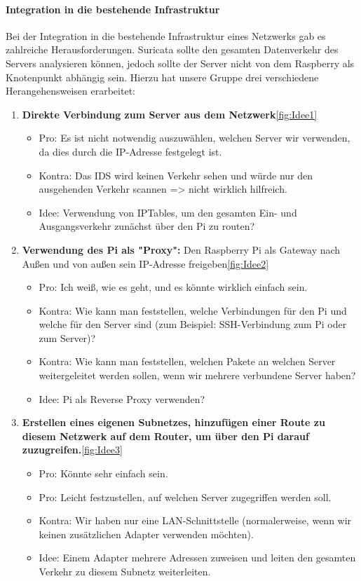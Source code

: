 \documentclass{article}
\begin{document}
\vfil \break

\paragraph{Integration in die bestehende Infrastruktur}
Bei der Integration in die bestehende Infrastruktur eines Netzwerks gab es zahlreiche Herausforderungen. Suricata sollte den gesamten Datenverkehr des Servers analysieren können, jedoch sollte der Server nicht von dem Raspberry als Knotenpunkt abhängig sein. Hierzu hat unsere Gruppe drei verschiedene Herangehensweisen erarbeitet:

\begin{enumerate}
    \item \textbf{Direkte Verbindung zum Server aus dem Netzwerk}\ref{fig:Idee1}
    \begin{itemize}
        \item Pro: Es ist nicht notwendig auszuwählen, welchen Server wir verwenden, da dies durch die IP-Adresse festgelegt ist.
        \item Kontra: Das IDS wird keinen Verkehr sehen und würde nur den ausgehenden Verkehr scannen => nicht wirklich hilfreich.
        \item Idee: Verwendung von IPTables, um den gesamten Ein- und Ausgangsverkehr zunächst über den Pi zu routen?
    \end{itemize}
    \item \textbf{Verwendung des Pi als "Proxy":} Den Raspberry Pi als Gateway nach Außen und von außen sein IP-Adresse freigeben\ref{fig:Idee2}
    \begin{itemize}
        \item Pro: Ich weiß, wie es geht, und es könnte wirklich einfach sein.
        \item Kontra: Wie kann man feststellen, welche Verbindungen für den Pi und welche für den Server sind (zum Beispiel: SSH-Verbindung zum Pi oder zum Server)?
        \item Kontra: Wie kann man feststellen, welchen Pakete an welchen Server weitergeleitet werden sollen, wenn wir mehrere verbundene Server haben?
        \item Idee: Pi als Reverse Proxy verwenden?
    \end{itemize}
    
    \item \textbf{Erstellen eines eigenen Subnetzes, hinzufügen einer Route zu diesem Netzwerk auf dem Router, um über den Pi darauf zuzugreifen.}\ref{fig:Idee3}
    \begin{itemize}
        \item Pro: Könnte sehr einfach sein.
        \item Pro: Leicht festzustellen, auf welchen Server zugegriffen werden soll.
        \item Kontra: Wir haben nur eine LAN-Schnittstelle (normalerweise, wenn wir keinen zusätzlichen Adapter verwenden möchten).
        \item Idee: Einem Adapter mehrere Adressen zuweisen und leiten den gesamten Verkehr zu diesem Subnetz weiterleiten.
    \end{itemize}
\end{enumerate}
\vfil \break
\end{document}
